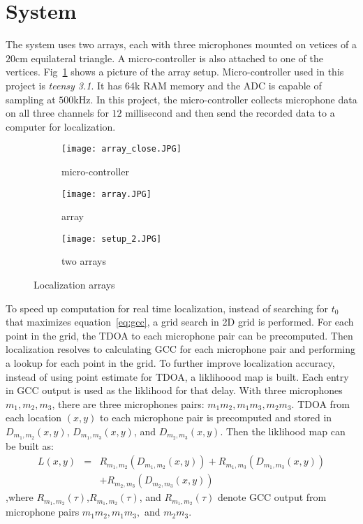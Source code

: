 \section{System}
The system uses two arrays, each with three microphones mounted on vetices of a $20$cm equilateral triangle. A micro-controller is also attached to one of the vertices. Fig~\ref{fig:setup_array} shows a picture of the array setup. Micro-controller used in this project is \emph{teensy 3.1}. It has $64$k RAM memory and the ADC is capable of sampling at $500$kHz. In this project, the micro-controller collects microphone data on all three channels for $12$ millisecond and then send the recorded data to a computer for localization. 

\begin{figure}[]
  \centering
  \begin{subfigure}[]{.15\textwidth}
    \texttt{[image: array\_close.JPG]}
    \caption{micro-controller}
  \end{subfigure}
  \begin{subfigure}[]{.15\textwidth}
    \texttt{[image: array.JPG]}
    \caption{array}
  \end{subfigure}
  \begin{subfigure}[]{.15\textwidth}
    \texttt{[image: setup\_2.JPG]}
    \caption{two arrays}
  \end{subfigure}
  \caption{Localization arrays}
  \label{fig:setup_array}
\end{figure}

To speed up computation for real time localization, instead of searching for $t_0$ that maximizes equation~\ref{eq:gcc}, a grid search in 2D grid is performed. For each point in the grid, the TDOA to each microphone pair can be precomputed. Then localization resolves to calculating GCC for each microphone pair and performing a lookup for each point in the grid. To further improve localization accuracy, instead of using point estimate for TDOA, a liklihoood map is built. Each entry in GCC output is used as the liklihood for that delay. With three microphones $m_1,m_2,m_3$, there are three microphones pairs: $m_1m_2,m_1m_3,m_2m_3$. TDOA from each location $(x,y)$ to each microphone pair is precomputed and stored in $D_{m_1,m_2}(x,y)$, $D_{m_1,m_3}(x,y)$, and $D_{m_2,m_3}(x,y)$. Then the liklihood map can be built as:
\begin{eqnarray*}
  L(x,y) &=& R_{m_1,m_2}(D_{m_1,m_2}(x,y)) + R_{m_1,m_3}(D_{m_1,m_3}(x,y)) \\
 & & +R_{m_2,m_3}(D_{m_2,m_3}(x,y)) 
\end{eqnarray*}
,where $R_{m_1,m_2}(\tau)$,$R_{m_1,m_2}(\tau)$, and $R_{m_1,m_2}(\tau)$ denote GCC output from microphone pairs $m_1m_2,m_1m_3,$ and $m_2m_3$.

